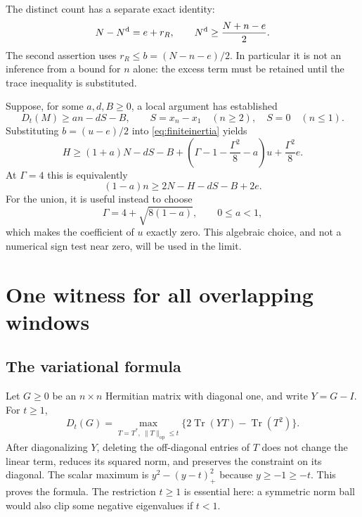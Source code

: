 \documentclass[11pt]{amsart}
\numberwithin{equation}{section}
\newcommand{\Tr}{\operatorname{Tr}}
\newcommand{\op}{\mathrm{op}}
\newcommand{\Nd}{N^{\rm d}}
\begin{document}
The distinct count has a separate exact identity:
\begin{equation}
 N-\Nd=e+r_R,\qquad
 \Nd\ge\frac{N+n-e}{2}.\label{eq:distinctidentity}
\end{equation}
The second assertion uses $r_R\le b=(N-n-e)/2$. In particular it is
not an inference from a bound for $n$ alone: the excess term must be
retained until the trace inequality is substituted.

Suppose, for some $a,d,B\ge0$, a local argument has established
\begin{equation}
 D_t(M)\ge an-dS-B,\qquad
 S=x_n-x_1\quad(n\ge2),\quad S=0\quad(n\le1).
 \label{eq:affinedefect}
\end{equation}
Substituting $b=(u-e)/2$ into \eqref{eq:finiteinertia} yields
\begin{equation}
 H\ge(1+a)N-dS-B+
 \left(\Gamma-1-\frac{\Gamma^2}{8}-a\right)u
 +\frac{\Gamma^2}{8}e.\label{eq:masterexcess}
\end{equation}
At $\Gamma=4$ this is equivalently
\begin{equation}
 (1-a)n\ge2N-H-dS-B+2e.\label{eq:intersectionfinite}
\end{equation}
For the union, it is useful instead to choose
\begin{equation}
 \Gamma=4+\sqrt{8(1-a)},\qquad 0\le a<1,
 \label{eq:unionthreshold}
\end{equation}
which makes the coefficient of $u$ exactly zero. This algebraic choice,
and not a numerical sign test near zero, will be used in the limit.

\section{One witness for all overlapping windows}
\label{sec:witness}

\subsection{The variational formula}

Let $G\ge0$ be an $n\times n$ Hermitian matrix with diagonal one, and
write $Y=G-I$. For $t\ge1$,
\begin{equation}
 D_t(G)=\max_{T=T^*,\ \|T\|_\op\le t}
       \{2\Tr(YT)-\Tr(T^2)\}.\label{eq:dual}
\end{equation}
After diagonalizing $Y$, deleting the off-diagonal entries of $T$ does
not change the linear term, reduces its squared norm, and preserves the
constraint on its diagonal. The scalar maximum is
$y^2-(y-t)_+^2$ because $y\ge-1\ge-t$. This proves the formula.
The restriction $t\ge1$ is essential here: a symmetric norm ball would
also clip some negative eigenvalues if $t<1$.
\end{document}
